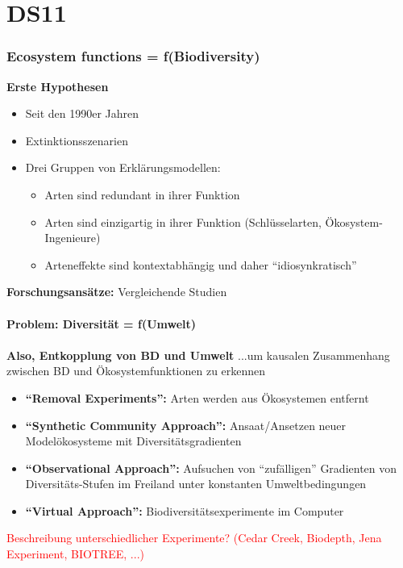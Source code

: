 \section{DS11}
\subsubsection{Ecosystem functions = f(Biodiversity)}
\textbf{Erste Hypothesen}
\begin{itemize}
	\item Seit den 1990er Jahren
	\item Extinktionsszenarien
	\item Drei Gruppen von Erklärungsmodellen:
	\begin{itemize}
		\item Arten sind redundant in ihrer Funktion
		\item Arten sind einzigartig in ihrer Funktion (Schlüsselarten, Ökosystem-Ingenieure)
		\item Arteneffekte sind kontextabhängig und daher “idiosynkratisch”
	\end{itemize}
\end{itemize}

\textbf{Forschungsansätze:} Vergleichende Studien
\\\\
\textbf{Problem: Diversität = f(Umwelt)}
\\\\
\textbf{Also, Entkopplung von BD und Umwelt}
...um kausalen Zusammenhang zwischen BD und Ökosystemfunktionen zu erkennen
\begin{itemize}
	\item \textbf{“Removal Experiments”:} Arten werden aus Ökosystemen entfernt
	\item \textbf{“Synthetic Community Approach”:} Ansaat/Ansetzen neuer Modelökosysteme mit Diversitätsgradienten
	\item \textbf{“Observational Approach”:} Aufsuchen von “zufälligen” Gradienten von Diversitäts-Stufen im Freiland unter konstanten Umweltbedingungen
	\item \textbf{“Virtual Approach”:} Biodiversitätsexperimente im Computer
\end{itemize}

\textcolor{red}{Beschreibung unterschiedlicher Experimente? (Cedar Creek, Biodepth, Jena Experiment, BIOTREE, ...)}

\newpage
